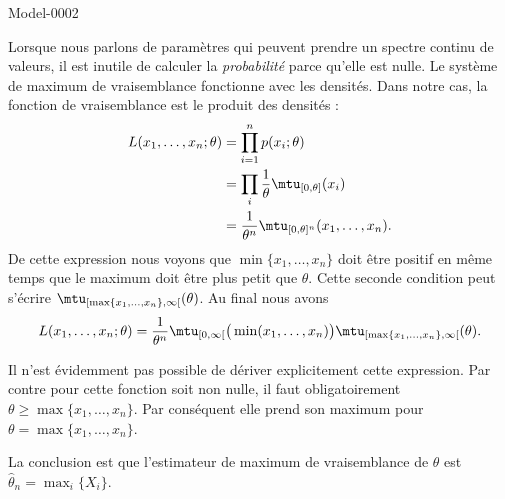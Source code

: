 
\begin{corrige}{Model-0002}

    Lorsque nous parlons de paramètres qui peuvent prendre un spectre continu de valeurs, il est inutile de calculer la \emph{probabilité} parce qu'elle est nulle. Le système de maximum de vraisemblance fonctionne avec les densités. Dans notre cas, la fonction de vraisemblance est le produit des densités :
    \begin{subequations}
        \begin{align}
            L(x_1,\ldots,x_n;\theta)&=\prod_{i=1}^np(x_i;\theta)\\
            &=\prod_i\frac{1}{ \theta }\mtu_{\mathopen[ 0, \theta \mathclose]}(x_i)\\
            &=\frac{1}{ \theta^n }\mtu_{\mathopen[ 0 , \theta \mathclose]^n}(x_1,\ldots,x_n).
        \end{align}
    \end{subequations}
    De cette expression nous voyons que \( \min\{ x_1,\ldots,x_n \}\) doit être positif en même temps que le maximum doit être plus petit que \( \theta\). Cette seconde condition peut s'écrire \( \mtu_{\mathopen[ \max\{ x_1,\ldots,x_n \} , \infty [}(\theta)\). Au final nous avons
    \begin{equation}
        L(x_1,\ldots,x_n;\theta)=\frac{1}{ \theta^n }\mtu_{\mathopen[ 0 , \infty [}\big( \min(x_1,\ldots,x_n) \big)\mtu_{\mathopen[ \max\{ x_1,\ldots,x_n \} , \infty [}(\theta).
    \end{equation}
    
    Il n'est évidemment pas possible de dériver explicitement cette expression. Par contre pour cette fonction soit non nulle, il faut obligatoirement \( \theta\geq\max\{ x_1,\ldots,x_n \}\). Par conséquent elle prend son maximum pour \( \theta=\max\{ x_1,\ldots,x_n \}\).

    La conclusion est que l'estimateur de maximum de vraisemblance de \( \theta\) est \( \hat\theta_n=\max_i\{ X_i \}\).

\end{corrige}
